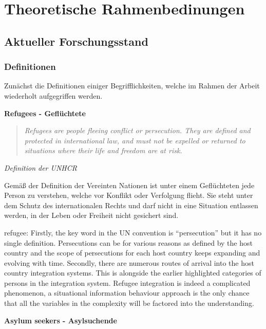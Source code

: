 \section{Theoretische Rahmenbedinungen}

\subsection{Aktueller Forschungsstand}

\subsubsection{Definitionen}

Zunächst die Definitionen einiger Begrifflichkeiten, welche im Rahmen der Arbeit wiederholt aufgegriffen werden.\newline

\textbf{Refugees - Geflüchtete}

\begin{quote}
    \textit{Refugees are people fleeing conflict or persecution. They are defined and protected in international law, and must not be expelled or returned to situations where their life and freedom are at risk.}\cite{unhcr2017refugees}
\end{quote}
\centerline{\textit{Definition der UNHCR}}

Gemäß der Definition der Vereinten Nationen ist unter einem Geflüchteten jede Person zu verstehen, welche vor Konflikt oder Verfolgung flieht. Sie steht unter dem Schutz des internationalen Rechts und darf nicht in eine Situation entlassen werden, in der Leben oder Freiheit nicht gesichert sind.\newline

refugee:
Firstly, the key word in the UN convention is “persecution”
but it has no single definition. Persecutions can be for
various reasons as defined by the host country and the
scope of persecutions for each host country keeps
expanding and evolving with time. Secondly, there are
numerous routes of arrival into the host country integration
systems. This is alongside the earlier highlighted categories
of persons in the integration system. Refugee integration is
indeed a complicated phenomenon, a situational
information behaviour approach is the only chance that all
the variables in the complexity will be factored into the
understanding.


\textbf{Asylum seekers - Asylsuchende}

